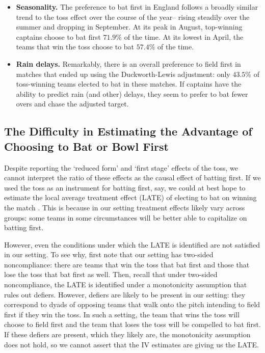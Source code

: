 \documentclass[12pt, letterpaper]{article}
\begin{document}
\begin{itemize}
\item \textbf{Seasonality.} The preference to bat first in England follows a broadly similar trend to the toss effect over the course of the year-- rising steadily over the summer and dropping in September. At its peak in August, top-winning captains choose to bat first $71.9\%$ of the time. At its lowest in April, the teams that win the toss choose to bat $57.4\%$ of the time.

\item \textbf{Rain delays.} Remarkably, there is an overall preference to field first in matches that ended up using the Duckworth-Lewis adjustment: only $43.5\%$ of toss-winning teams elected to bat in these matches. If captains have the ability to predict rain (and other) delays, they seem to prefer to bat fewer overs and chase the adjusted target.

\end{itemize}

\subsection{The Difficulty in Estimating the Advantage of Choosing to Bat or Bowl First}

Despite reporting the `reduced form' and `first stage' effects of the toss, we cannot interpret the ratio of these effects as the causal effect of batting first. If we used the toss as an instrument for batting first, say, we could at best hope to estimate the local average treatment effect (LATE) of electing to bat on winning the match \citep{angrist1996identification}. This is because in our setting treatment effects likely vary across groups: some teams in some circumstances will be better able to capitalize on batting first.  

However, even the conditions under which the LATE is identified are not satisfied in our setting. To see why, first note that our setting has two-sided noncompliance: there are teams that win the toss that bat first and those that lose the toss that bat first as well. Then, recall that under two-sided noncompliance, the LATE is identified under a monotonicity assumption that rules out defiers. However, defiers are likely to be present in our setting: they correspond to dyads of opposing teams that walk onto the pitch intending to field first if they win the toss. In such a setting, the team that wins the toss will choose to field first and the team that loses the toss will be compelled to bat first. If these defiers are present, which they likely are, the monotonicity assumption does not hold, so we cannot assert that the IV estimates are giving us the LATE.
\end{document}
